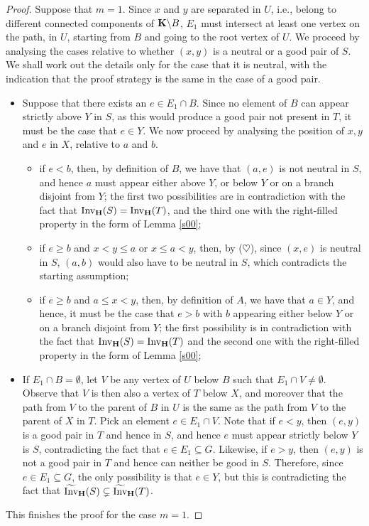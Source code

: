 \documentclass[10pt,a4paper]{amsart}
\newcommand{\Invt}{\widetilde{\mathrm{Inv}}}
\newcommand{\Inv}{{\mathrm{Inv}}}
\begin{document}
\begin{proof}
Suppose that $m=1$. Since $x$ and $y$ are separated in $U$, i.e., belong to different connected components of ${\bf K}\backslash B$, $E_1$ must intersect at least one vertex on the path, in $U$, starting from $B$ and going to the root vertex of $U$. We proceed by analysing the cases relative to whether $(x,y)$ is a neutral or a good pair of $S$. We shall work out the details only for the case that it is neutral, with the indication that the proof strategy is the same in the case of a good pair. 
\begin{itemize}
\item Suppose that there exists an $e\in E_1\cap B$. Since no element of $B$ can appear strictly above $Y$ in $S$, as this would produce a good pair not present in $T$, it must be the case that $e\in Y$. We now proceed by analysing the position of $x,y$ and $e$ in $X$, relative to $a$ and $b$.
\begin{itemize}
\item if $e<b$, then, by definition of $B$, we have that $(a,e)$ is not neutral in $S$, and hence $a$ must appear either above $Y$, or below $Y$ or on a branch disjoint from $Y$; the first two possibilities are in contradiction with the fact that $\Inv_{\bf H}(S)= \Inv_{\bf H}(T)$, and the third one with the right-filled property in the form of Lemma \ref{s00};
\item if $e\geq b$ and $x<y\leq a$ or $x\leq a<y$, then, by ($\heartsuit$), since $(x,e)$ is neutral in $S$, $(a,b)$ would also have to be neutral in $S$, which contradicts the starting assumption;
\item if $e\geq b$ and $a\leq x<y$, then, by definition of $A$, we have that $a\in Y$, and hence, it must be the case that $e>b$ with $b$ appearing either below $Y$ or on a branch disjoint from $Y$; the first possibility is in contradiction with the fact that $\Inv_{\bf H}(S)= \Inv_{\bf H}(T)$ and the second one with the right-filled property in the form of Lemma \ref{s00}; 
\end{itemize}
\item If $E_1\cap B=\emptyset$, let $V$ be any vertex of $U$ below $B$ such that $E_1\cap V\neq \emptyset$. Observe that $V$ is then also a vertex of $T$ below $X$, and moreover that the path from $V$ to the parent of $B$ in $U$ is the same as the path from $V$ to the parent of $X$ in $T$. Pick an element $e\in E_1\cap V$. Note that if $e<y$, then $(e,y)$ is a good pair in $T$ and hence in $S$, and hence $e$ must appear strictly below $Y$ is $S$, contradicting the fact that $e\in E_1\subseteq G$. Likewise, if $e>y$, then $(e,y)$ is not a good pair in $T$ and hence can neither be good in $S$. Therefore, since $e\in E_1\subseteq G$, the only possibility is that $e\in Y$, but this is contradicting the fact that $\Invt_{\bf H}(S)\subsetneq \Invt_{\bf H}(T)$. 
\end{itemize}
This finishes the proof for the case $m=1$.


\end{proof}
\end{document}
